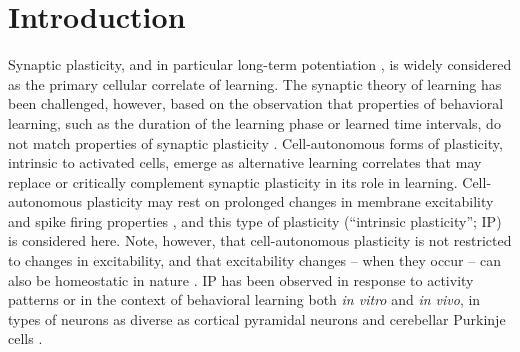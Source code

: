 \section{Introduction}

Synaptic plasticity, and in particular long-term potentiation \citep[LTP;][]{Bliss1973-od,Nabavi2014-fn},
    is widely considered as the primary cellular correlate of learning.
    The synaptic theory of learning has been challenged, however,
        based on the observation that properties of behavioral learning,
        such as the duration of the learning phase or learned time intervals,
        do not match properties of synaptic plasticity \citep[see][]{Gallistel2013-qm,Gallistel2014-el}.
    Cell-autonomous forms of plasticity, intrinsic to activated cells,
        emerge as alternative learning correlates \citep{Gershman2021-eu} that may
            replace \citep{Johansson2015-ql,Gallistel2017-em,Johansson2019-sg}
            or critically complement \citep[e.g.][]{Titley2017-da,Hansel2020-ep,Josselyn2020-et}
        synaptic plasticity in its role in learning.
    Cell-autonomous plasticity may rest on prolonged changes in membrane excitability and spike firing properties \citep{Marder1996-mp,Hansel2001-ti},
        and this type of plasticity (``intrinsic plasticity''; IP) is considered here.
    Note, however, that cell-autonomous plasticity is not restricted to changes in excitability,
       and that excitability changes -- when they occur -- can also be homeostatic in nature \citep{Turrigiano1999-pn}.
    IP has been observed
        in response to activity patterns or in the context of behavioral learning both \textit{in vitro} and \textit{in vivo},
        in types of neurons as diverse as cortical pyramidal neurons \citep[e.g.][]{Paz2009-yn,Mahon2012-bt,Moyer1996-bq}
        and cerebellar Purkinje cells \citep[e.g][]{Schreurs1998-de,Belmeguenai2010-ee,Titley2020-df}.

